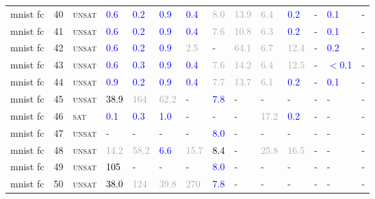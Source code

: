 \begin{center}
{\begin{longtable}{@{}llllllllllllll@{}}
mnist fc & 40 & \textsc{unsat} & \textcolor{blue}{0.6} & \textcolor{blue}{0.2} & \textcolor{blue}{0.9} & \textcolor{blue}{0.4} & \textcolor{darkgray}{8.0} & \textcolor{darkgray}{13.9} & \textcolor{darkgray}{6.4} & \textcolor{blue}{0.2} & - & \textcolor{blue}{0.1} & - \\
mnist fc & 41 & \textsc{unsat} & \textcolor{blue}{0.6} & \textcolor{blue}{0.2} & \textcolor{blue}{0.9} & \textcolor{blue}{0.4} & \textcolor{darkgray}{7.6} & \textcolor{darkgray}{10.8} & \textcolor{darkgray}{6.3} & \textcolor{blue}{0.2} & - & \textcolor{blue}{0.1} & - \\
mnist fc & 42 & \textsc{unsat} & \textcolor{blue}{0.6} & \textcolor{blue}{0.2} & \textcolor{blue}{0.9} & \textcolor{darkgray}{2.5} & - & \textcolor{darkgray}{64.1} & \textcolor{darkgray}{6.7} & \textcolor{darkgray}{12.4} & - & \textcolor{blue}{0.2} & - \\
mnist fc & 43 & \textsc{unsat} & \textcolor{blue}{0.6} & \textcolor{blue}{0.3} & \textcolor{blue}{0.9} & \textcolor{blue}{0.4} & \textcolor{darkgray}{7.6} & \textcolor{darkgray}{14.2} & \textcolor{darkgray}{6.4} & \textcolor{darkgray}{12.5} & - & \textcolor{blue}{$<$0.1} & - \\
mnist fc & 44 & \textsc{unsat} & \textcolor{blue}{0.9} & \textcolor{blue}{0.2} & \textcolor{blue}{0.9} & \textcolor{blue}{0.4} & \textcolor{darkgray}{7.7} & \textcolor{darkgray}{13.7} & \textcolor{darkgray}{6.1} & \textcolor{blue}{0.2} & - & \textcolor{blue}{0.1} & - \\
mnist fc & 45 & \textsc{unsat} & \textcolor{black}{38.9} & \textcolor{darkgray}{164} & \textcolor{darkgray}{62.2} & - & \textcolor{blue}{7.8} & - & - & - & - & - & - \\
mnist fc & 46 & \textsc{sat} & \textcolor{blue}{0.1} & \textcolor{blue}{0.3} & \textcolor{blue}{1.0} & - & - & - & \textcolor{darkgray}{17.2} & \textcolor{blue}{0.2} & - & - & - \\
mnist fc & 47 & \textsc{unsat} & - & - & - & - & \textcolor{blue}{8.0} & - & - & - & - & - & - \\
mnist fc & 48 & \textsc{unsat} & \textcolor{darkgray}{14.2} & \textcolor{darkgray}{58.2} & \textcolor{blue}{6.6} & \textcolor{darkgray}{15.7} & \textcolor{black}{8.4} & - & \textcolor{darkgray}{25.8} & \textcolor{darkgray}{16.5} & - & - & - \\
mnist fc & 49 & \textsc{unsat} & \textcolor{black}{105} & - & - & - & \textcolor{blue}{8.0} & - & - & - & - & - & - \\
mnist fc & 50 & \textsc{unsat} & \textcolor{black}{38.0} & \textcolor{darkgray}{124} & \textcolor{darkgray}{39.8} & \textcolor{darkgray}{270} & \textcolor{blue}{7.8} & - & - & - & - & - & - \\

\end{longtable}}
\end{center}
